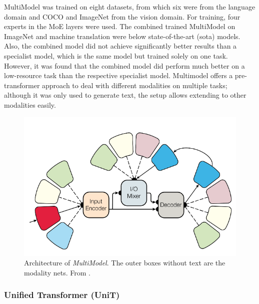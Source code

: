 \documentclass[
]{krantz}
\begin{document}
MultiModel was trained on eight datasets, from which six were from the language domain and COCO \citep{mccoco} and ImageNet \citep{ImageNet} from the vision domain. For training, four experts in the MoE layers were used. The combined trained MultiModel on ImageNet and machine translation were below state-of-the-art (sota) models. Also, the combined model did not achieve significantly better results than a specialist model, which is the same model but trained solely on one task. However, it was found that the combined model did perform much better on a low-resource task than the respective specialist model.
Multimodel offers a pre-transformer approach to deal with different modalities on multiple tasks; although it was only used to generate text, the setup allows extending to other modalities easily.

\begin{figure}

{\centering \includegraphics[width=0.8\linewidth]{figures/03-03-multipurpose/multimodel} 

}

\caption{Architecture of \emph{MultiModel}. The outer boxes without text are the modality nets. From \citet{Kaiser2017}.}\label{fig:multimodel}
\end{figure}



\hypertarget{unified-transformer-unit}{%
\subsubsection{Unified Transformer (UniT)}\label{unified-transformer-unit}}
\end{document}
